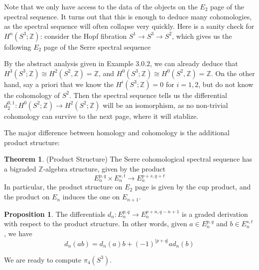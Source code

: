 \documentclass{article}
\theoremstyle{definition}
\newtheorem{theorem}{Theorem}[section]
\theoremstyle{definition}
\newtheorem{proposition}{Proposition}[theorem]
\theoremstyle{definition}
\theoremstyle{definition}
\theoremstyle{definition}
\theoremstyle{definition}
\begin{document}
Note that we only have access to the data of the objects on the $E_2$ page of the spectral sequence. It turns out that this is enough to deduce many cohomologies, as the spectral sequence will often collapse very quickly. Here is a sanity check for $H^n(S^3; \mathbb{Z})$: consider the Hopf fibration $S^1\to S^3\to S^2$, which gives us the following $E_2$ page of the Serre spectral sequence


By the abstract analysis given in Example $3.0.2$, we can already deduce that $H^3(S^3;\mathbb{Z})\cong H^2(S^2, \mathbb{Z})=\mathbb{Z}$, and  $H^0(S^3;\mathbb{Z})\cong H^0(S^2, \mathbb{Z})=\mathbb{Z}$. On the other hand, say a priori that we know the $H^i(S^3;\mathbb{Z})=0$ for $i=1,2$, but do not know the cohomology of $S^2$. Then the spectral sequence tells us the differential $d_2^{0,1}: H^0(S^2;\mathbb{Z})\to H^2(S^2;\mathbb{Z})$ will be an isomorphism, as no non-trivial cohomology can survive to the next page, where it will stablize.




The major difference between homology and cohomology is the additional product structure:
\begin{tcolorbox}[colback=red!5!white,colframe=red!30!white]
\begin{theorem}
(Product Structure) The Serre cohomological spectral sequence has a bigraded $\mathbb{Z}$-algebra structure, given by the product 
\[
E_n^{p,q}\times E_n^{s,t}\to E_n ^{p+s,q+t}
\]
In particular, the product structure on $E_2$ page is given by the cup product, and the product on $E_n$ induces the one on $E_{n+1}$.
\end{theorem}
\end{tcolorbox}


\begin{tcolorbox}[colback=blue!5!white,colframe=blue!30!white]
\begin{proposition}
    The differentials $d_n: E_n ^{p,q}\to E_n ^{p+n, q-n+1}$ is a graded derivation with respect to the product structure. In other words, given $a\in E_n ^{p,q}$ and $b\in E_n^{s,t}$, we have 
    \[
        d_n(ab)=d_n(a)b+(-1)^{|p+q|}ad_n(b) 
    \]
\end{proposition}
\end{tcolorbox}
We are ready to compute $\pi_4(S^3)$.
\end{document}

